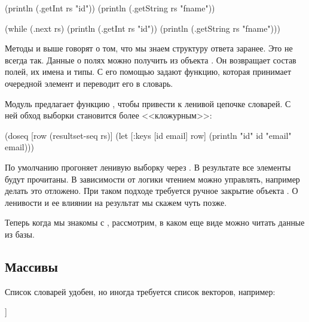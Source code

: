 \begin{english}
  \begin{clojure}
(println (.getInt rs "id"))
(println (.getString rs "fname"))

(while (.next rs)
  (println (.getInt rs "id"))
  (println (.getString rs "fname")))
  \end{clojure}
\end{english}

Методы  и  выше говорят о том, что мы знаем структуру ответа заранее. Это не всегда так. Данные о полях можно получить из объекта . Он возвращает состав полей, их имена и типы. С его помощью задают функцию, которая принимает очередной элемент  и переводит его в словарь.

Модуль  предлагает функцию , чтобы привести  к ленивой цепочке словарей. С ней обход выборки становится более <<кложурным>>:

\begin{english}
  \begin{clojure}
(doseq [row (resultset-seq rs)]
  (let [{:keys [id email]} row]
    (println "id" id "email" email)))
  \end{clojure}
\end{english}

По умолчанию  прогоняет ленивую выборку через . В результате все элементы  будут прочитаны. В зависимости от логики чтением можно управлять, например делать это отложено. При таком подходе требуется ручное закрытие объекта . О ленивости и ее влиянии на результат мы скажем чуть позже.

Теперь когда мы знакомы с , рассмотрим, в каком еще виде можно читать данные из базы.

\subsection{Массивы}

Список словарей удобен, но иногда требуется список векторов, например:

\begin{english}
  \begin{clojure}
[[1 "Ivan" "Petrov" "test@test.com"]
 [2 "Ivan" "Petrov" "ivan@test.com"]
 [3 "John" "Smith" "john@test.com"]]
  \end{clojure}
\end{english}

